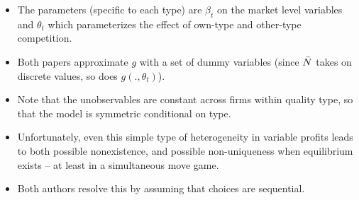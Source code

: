 \begin{frame}%


\begin{itemize}
\item The parameters (specific to each type) are $\beta _{t}$ on the market
level variables and $\theta _{t}$ which parameterizes the effect of own-type
and other-type competition.

\item Both papers approximate $g$ with a set of dummy variables (since $\bar{%
N}$ takes on discrete values, so does $g(.,\theta _{t})$).

\item Note that the unobservables are constant across firms within quality
type, so that the model is symmetric conditional on type.

\item Unfortunately, even this simple type of heterogeneity in variable
profits leads to both possible nonexistence, and possible non-uniqueness
when equilibrium exists -- at least in a simultaneous move game.

\item Both authors resolve this by assuming that choices are sequential.
\end{itemize}

\end{frame}%

